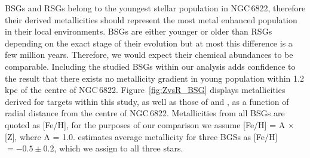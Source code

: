 \documentclass[manuscript]{aastex}
\def\2{\footnotesize II\normalsize}
\begin{document}


BSGs and RSGs belong to the youngest stellar population in NGC\,6822,
therefore their derived metallicities should represent the most metal enhanced population in their local environments.
BSGs are either younger or older than RSGs depending on the exact stage of their evolution but at most this difference is a few million years.
Therefore, we would expect their chemical abundances to be comparable.
Including the studied BSGs within our analysis adds confidence to the result that there exists no metallicity gradient in young population within 1.2\,kpc of the centre of NGC\,6822.
Figure~\ref{fig:ZvsR_BSG} displays metallicities derived for targets within this study, as well as those of
\cite{2001ApJ...547..765V} and
\cite{1999A&A...352L..40M}, as a function of radial distance from the centre of NGC\,6822.
Metallicities from all BSGs are quoted as [Fe/H], for the purposes of our comparison we assume [Fe/H] = A $\times$ [Z], where A = 1.0.
\cite{1999A&A...352L..40M} estimates average metallicity for three BGSs as
[Fe/H]$=-0.5\pm 0.2$, which we assign to all three stars.

\end{document}

